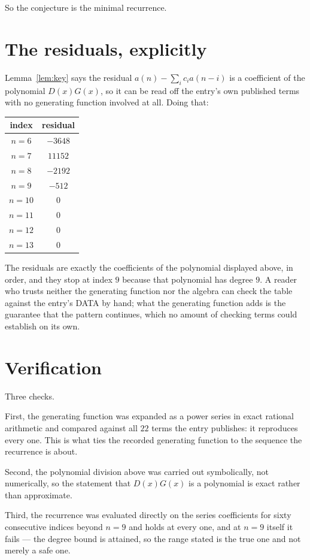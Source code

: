 \documentclass[11pt,a4paper]{article}
\theoremstyle{plain}
\theoremstyle{definition}
\begin{document}
So the conjecture is the minimal recurrence.

\section{The residuals, explicitly}

Lemma~\ref{lem:key} says the residual $a(n)-\sum_ic_ia(n-i)$ is a coefficient of the
polynomial $D(x)G(x)$, so it can be read off the entry's own published terms with no
generating function involved at all. Doing that:
\begin{center}
\begin{tabular}{cc}
index & residual \\ \hline
$n=6$ & $-3648$ \\
$n=7$ & $11152$ \\
$n=8$ & $-2192$ \\
$n=9$ & $-512$ \\
$n=10$ & $0$ \\
$n=11$ & $0$ \\
$n=12$ & $0$ \\
$n=13$ & $0$
\end{tabular}
\end{center}
The residuals are exactly the coefficients of the polynomial displayed above, in order, and
they stop at index $9$ because that polynomial has degree $9$. A reader who trusts
neither the generating function nor the algebra can check the table against the entry's DATA
by hand; what the generating function adds is the guarantee that the pattern continues, which
no amount of checking terms could establish on its own.

\section{Verification}

Three checks.

First, the generating function was expanded as a power series in exact rational arithmetic and
compared against all $22$ terms the entry publishes: it reproduces every one. This is
what ties the recorded generating function to the sequence the recurrence is about.

Second, the polynomial division above was carried out symbolically, not numerically, so the
statement that $D(x)G(x)$ is a polynomial is exact rather than approximate.

Third, the recurrence was evaluated directly on the series coefficients for sixty consecutive
indices beyond $n=9$ and holds at every one, and at $n=9$ itself it fails --- the
degree bound is attained, so the range stated is the true one and not merely a safe one.
\end{document}
